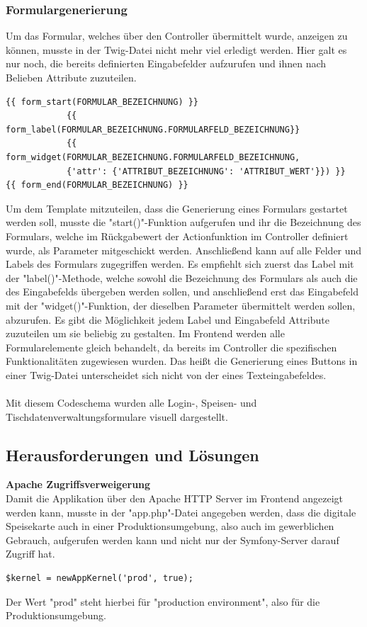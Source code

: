     \subsubsection{Formulargenerierung}

Um das Formular, welches über den Controller übermittelt wurde, anzeigen zu können, musste in der Twig-Datei nicht mehr viel erledigt werden. Hier galt es nur noch, die bereits definierten Eingabefelder aufzurufen und ihnen nach Belieben Attribute zuzuteilen.
\lstset{language = java}
  	\begin{lstlisting}
{{ form_start(FORMULAR_BEZEICHNUNG) }}
            {{ form_label(FORMULAR_BEZEICHNUNG.FORMULARFELD_BEZEICHNUNG}}
            {{ form_widget(FORMULAR_BEZEICHNUNG.FORMULARFELD_BEZEICHNUNG, 
            {'attr': {'ATTRIBUT_BEZEICHNUNG': 'ATTRIBUT_WERT'}}) }}
{{ form_end(FORMULAR_BEZEICHNUNG) }}
	\end{lstlisting}
Um dem Template mitzuteilen, dass die Generierung eines Formulars gestartet werden soll, musste die "start()"-Funktion aufgerufen und ihr die Bezeichnung des Formulars, welche im Rückgabewert der Actionfunktion im Controller definiert wurde, als Parameter mitgeschickt werden. 
Anschließend kann auf alle Felder und Labels des Formulars zugegriffen werden. Es empfiehlt sich zuerst das Label mit der "label()"-Methode, welche sowohl die Bezeichnung des Formulars als auch die des Eingabefelds übergeben werden sollen, und anschließend erst das Eingabefeld mit der "widget()"-Funktion, der dieselben Parameter übermittelt werden sollen, abzurufen. Es gibt die Möglichkeit jedem Label und Eingabefeld Attribute zuzuteilen um sie beliebig zu gestalten. Im Frontend werden alle Formularelemente gleich behandelt, da bereits im Controller die spezifischen Funktionalitäten zugewiesen wurden. Das heißt die Generierung eines Buttons in einer Twig-Datei unterscheidet sich nicht von der eines Texteingabefeldes.
\\ \\
Mit diesem Codeschema wurden alle Login-, Speisen- und Tischdatenverwaltungsformulare visuell dargestellt.

  \subsection{Herausforderungen und Lösungen}

\textbf{Apache Zugriffsverweigerung}\\ 
Damit die Applikation über den Apache HTTP Server im Frontend angezeigt werden kann, musste in der "app.php"-Datei angegeben werden, dass die digitale Speisekarte auch in einer Produktionsumgebung, also auch im gewerblichen Gebrauch, aufgerufen werden kann und nicht nur der Symfony-Server darauf Zugriff hat.
	\lstset{language=php}
  	\begin{lstlisting}
$kernel = newAppKernel('prod', true);
  	\end{lstlisting}
Der Wert "prod" steht hierbei für "production environment", also für die Produktionsumgebung.
\pagebreak
